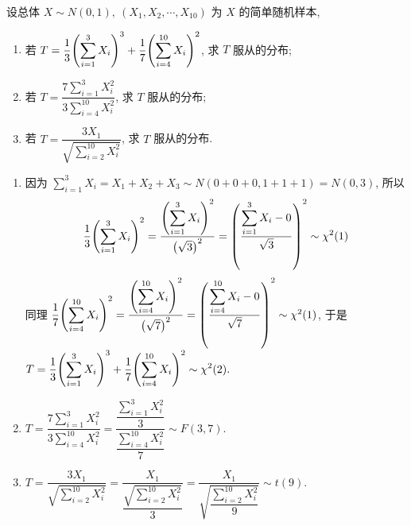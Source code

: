\begin{example}
    设总体 $X\sim N(0,1),~(X_1,X_2,\cdots,X_{10})$ 为 $X$ 的简单随机样本, 
    \begin{enumerate}[label=(\arabic{*})]
        \item 若 $T=\displaystyle\dfrac{1}{3}\qty(\sum_{i=1}^{3}X_i)^3+\dfrac{1}{7}\qty(\sum_{i=4}^{10}X_i)^2$, 求 $T$ 服从的分布;
        \item 若 $T=\dfrac{\displaystyle7\sum_{i=1}^{3}X_i^2}{\displaystyle 3\sum_{i=4}^{10}X_i^2}$, 求 $T$ 服从的分布;
        \item 若 $T=\dfrac{3X_1}{\sqrt{\displaystyle\sum_{i=2}^{10}X_i^2}}$, 求 $T$ 服从的分布.
    \end{enumerate}
\end{example}
\begin{solution}
    \begin{enumerate}[label=(\arabic{*})]
        \item 因为 $\displaystyle\sum_{i=1}^{3}X_i=X_1+X_2+X_3\sim N(0+0+0,1+1+1)=N(0,3)$, 所以
              $$\dfrac{1}{3}\qty(\sum_{i=1}^{3}X_i)^2=\dfrac{\displaystyle\qty(\sum_{i=1}^{3}X_i)^2}{\qty(\sqrt{3})^2}=\qty(\dfrac{\displaystyle\sum_{i=1}^{3}X_i-0}{\sqrt{3}})^2\sim \chi^2(1)$$
              同理 $\dfrac{1}{7}\qty(\displaystyle\sum_{i=4}^{10}X_i)^2=\dfrac{\qty(\displaystyle\sum_{i=4}^{10}X_i)^2}{\qty(\sqrt{7})^2}=\qty(\dfrac{\displaystyle\sum_{i=4}^{10}X_i-0}{\sqrt{7}})^2\sim\chi^2(1)$, 
              于是 $T=\displaystyle\dfrac{1}{3}\qty(\sum_{i=1}^{3}X_i)^3+\dfrac{1}{7}\qty(\sum_{i=4}^{10}X_i)^2\sim\chi^2(2).$
        \item $T=\dfrac{\displaystyle7\sum_{i=1}^{3}X_i^2}{\displaystyle 3\sum_{i=4}^{10}X_i^2}=\dfrac{\dfrac{\sum_{i=1}^{3}X_i^2}{3}}{\dfrac{\sum_{i=4}^{10}X_i^2}{7}}\sim F(3,7).$
        \item $T=\dfrac{3X_1}{\sqrt{\displaystyle\sum_{i=2}^{10}X_i^2}}=\dfrac{X_1}{\dfrac{\sqrt{\sum_{i=2}^{10}X_i^2}}{3}}=\dfrac{X_1}{\sqrt{\dfrac{\sum_{i=2}^{10}X_i^2}{9}}}\sim t(9).$
    \end{enumerate}
\end{solution}
